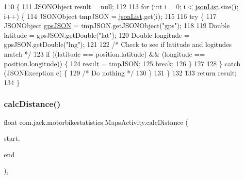 \begin{DoxyCode}
110                                                          \{
111         JSONObject result = null;
112 
113         \textcolor{keywordflow}{for} (\textcolor{keywordtype}{int} i = 0; i < \hyperlink{classcom_1_1jack_1_1motorbikestatistics_1_1_maps_activity_aaed26c36e08dad942830ab52d9d75d2e}{jsonList}.size(); i++) \{
114             JSONObject tmpJSON = \hyperlink{classcom_1_1jack_1_1motorbikestatistics_1_1_maps_activity_aaed26c36e08dad942830ab52d9d75d2e}{jsonList}.get(i);
115 
116             \textcolor{keywordflow}{try} \{
117                 JSONObject \hyperlink{logging-device_8ino_a548727e041a5cd3db91bdbd0ccd71e30}{gpsJSON} = tmpJSON.getJSONObject(\textcolor{stringliteral}{"gps"});
118 
119                 Double latitude = gpsJSON.getDouble(\textcolor{stringliteral}{"lat"});
120                 Double longitude = gpsJSON.getDouble(\textcolor{stringliteral}{"lng"});
121 
122                 \textcolor{comment}{/* Check to see if latitude and logitudes match */}
123                 \textcolor{keywordflow}{if} ((latitude == position.latitude) && (longitude == position.longitude)) \{
124                     result = tmpJSON;
125                     \textcolor{keywordflow}{break};
126                 \}
127 
128             \} \textcolor{keywordflow}{catch} (JSONException e) \{
129                 \textcolor{comment}{/* Do nothing */}
130             \}
131         \}
132 
133         \textcolor{keywordflow}{return} result;
134     \}
\end{DoxyCode}
\mbox{\label{classcom_1_1jack_1_1motorbikestatistics_1_1_maps_activity_af4feb7617c02a59c62d6e9257914e997}} 
\subsubsection{\texorpdfstring{calc\+Distance()}{calcDistance()}}
{\footnotesize\ttfamily float com.\+jack.\+motorbikestatistics.\+Maps\+Activity.\+calc\+Distance (\begin{DoxyParamCaption}\item[{Lat\+Lng}]{start,  }\item[{Lat\+Lng}]{end }\end{DoxyParamCaption})\hspace{0.3cm}{\ttfamily [inline]}, {\ttfamily [private]}}



